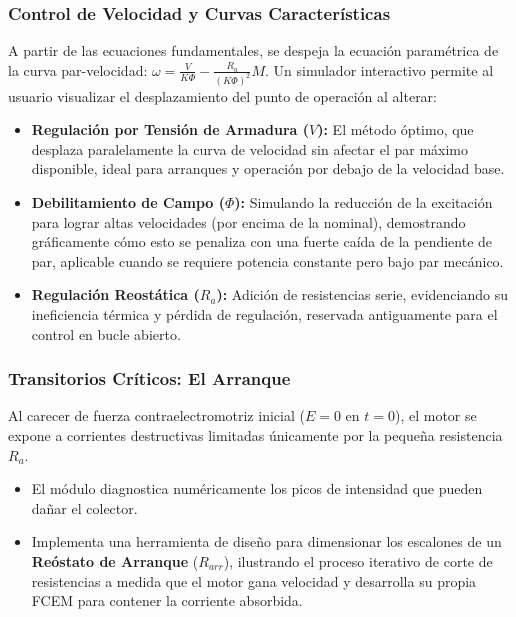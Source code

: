 \documentclass[11pt,a4paper]{article}
\begin{document}
\subsubsection{Control de Velocidad y Curvas Características}
A partir de las ecuaciones fundamentales, se despeja la ecuación paramétrica de la curva par-velocidad: $\omega = \frac{V}{K \Phi} - \frac{R_a}{(K \Phi)^2} M$. Un simulador interactivo permite al usuario visualizar el desplazamiento del punto de operación al alterar:
\begin{itemize}
    \item \textbf{Regulación por Tensión de Armadura ($V$):} El método óptimo, que desplaza paralelamente la curva de velocidad sin afectar el par máximo disponible, ideal para arranques y operación por debajo de la velocidad base.
    \item \textbf{Debilitamiento de Campo ($\Phi$):} Simulando la reducción de la excitación para lograr altas velocidades (por encima de la nominal), demostrando gráficamente cómo esto se penaliza con una fuerte caída de la pendiente de par, aplicable cuando se requiere potencia constante pero bajo par mecánico.
    \item \textbf{Regulación Reostática ($R_a$):} Adición de resistencias serie, evidenciando su ineficiencia térmica y pérdida de regulación, reservada antiguamente para el control en bucle abierto.
\end{itemize}

\subsubsection{Transitorios Críticos: El Arranque}
Al carecer de fuerza contraelectromotriz inicial ($E=0$ en $t=0$), el motor se expone a corrientes destructivas limitadas únicamente por la pequeña resistencia $R_a$. 
\begin{itemize}
    \item El módulo diagnostica numéricamente los picos de intensidad que pueden dañar el colector.
    \item Implementa una herramienta de diseño para dimensionar los escalones de un \textbf{Reóstato de Arranque} ($R_{arr}$), ilustrando el proceso iterativo de corte de resistencias a medida que el motor gana velocidad y desarrolla su propia FCEM para contener la corriente absorbida.
\end{itemize}
\end{document}
